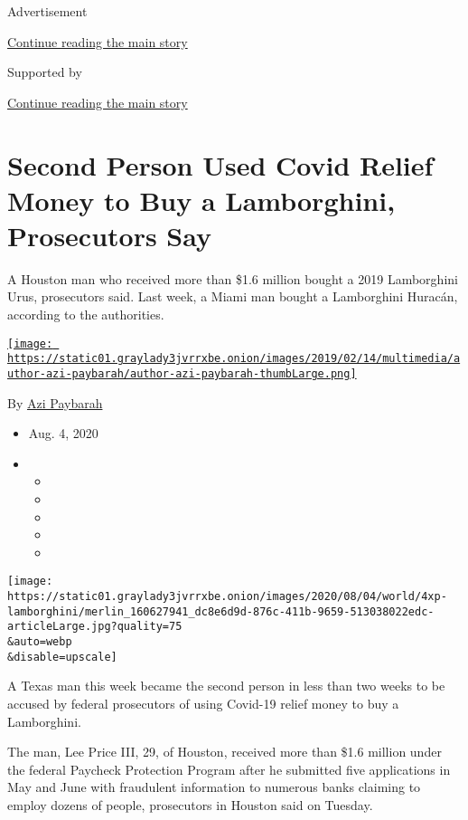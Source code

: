 Advertisement

\protect\hyperlink{after-top}{Continue reading the main story}

Supported by

\protect\hyperlink{after-sponsor}{Continue reading the main story}

\hypertarget{second-person-used-covid-relief-money-to-buy-a-lamborghini-prosecutors-say}{%
\section{Second Person Used Covid Relief Money to Buy a Lamborghini,
Prosecutors
Say}\label{second-person-used-covid-relief-money-to-buy-a-lamborghini-prosecutors-say}}

A Houston man who received more than \$1.6 million bought a 2019
Lamborghini Urus, prosecutors said. Last week, a Miami man bought a
Lamborghini Huracán, according to the authorities.

\href{https://www.nytimes3xbfgragh.onion/by/azi-paybarah}{\texttt{[image: https://static01.graylady3jvrrxbe.onion/images/2019/02/14/multimedia/author-azi-paybarah/author-azi-paybarah-thumbLarge.png]}}

By \href{https://www.nytimes3xbfgragh.onion/by/azi-paybarah}{Azi
Paybarah}

\begin{itemize}
\item
  Aug. 4, 2020
\item
  \begin{itemize}
  \item
  \item
  \item
  \item
  \item
  \end{itemize}
\end{itemize}

\texttt{[image: https://static01.graylady3jvrrxbe.onion/images/2020/08/04/world/4xp-lamborghini/merlin\_160627941\_dc8e6d9d-876c-411b-9659-513038022edc-articleLarge.jpg?quality=75\\\&auto=webp\\\&disable=upscale]}

A Texas man this week became the second person in less than two weeks to
be accused by federal prosecutors of using Covid-19 relief money to buy
a Lamborghini.

The man, Lee Price III, 29, of Houston, received more than \$1.6 million
under the federal Paycheck Protection Program after he submitted five
applications in May and June with fraudulent information to numerous
banks claiming to employ dozens of people, prosecutors in Houston said
on Tuesday.

